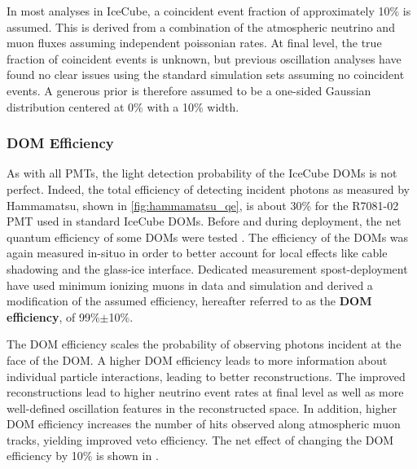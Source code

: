 In most analyses in IceCube, a coincident event fraction of approximately 10\% is assumed. 
This is derived from a combination of the  atmospheric neutrino and muon fluxes assuming independent poissonian rates.
At final level, the true fraction of coincident events is unknown, but previous oscillation analyses have found no clear issues using the standard simulation sets assuming no coincident events.
A generous prior is therefore assumed to be a one-sided Gaussian distribution centered at 0\% with a 10\% width. 

\subsubsection{DOM Efficiency}
\label{subsubsec:domeff}
As with all PMTs, the light detection probability of the IceCube DOMs is not perfect.
Indeed, the total efficiency of detecting incident photons as measured by Hammamatsu, shown in \ref{fig:hammamatsu_qe}, is about 30\% for the R7081-02 PMT used in standard IceCube DOMs. 
Before and during deployment, the net quantum efficiency of some DOMs were tested .
The efficiency of the DOMs was again measured in-situo  in order to better account for local effects like cable shadowing and the glass-ice interface.
Dedicated measurement spost-deployment have used minimum ionizing muons in data and simulation and derived 
a modification of the assumed efficiency, hereafter referred to as the \textbf{DOM efficiency}, of 99\%$\pm$10\%. 

The DOM efficiency scales the probability of observing photons incident at the face of the DOM.
A higher DOM efficiency leads to more information about individual particle interactions, leading to better reconstructions.
The improved reconstructions lead to higher neutrino event rates at final level as well as more well-defined oscillation features in the reconstructed space.
In addition, higher DOM efficiency increases the number of hits observed along atmospheric muon tracks, yielding improved veto efficiency.
The net effect of changing the DOM efficiency by 10\% is shown in .

